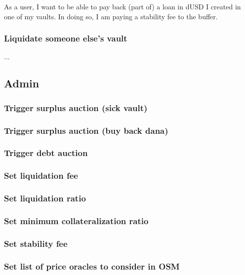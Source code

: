 \documentclass{article} %
\begin{document}
As a user, I want to be able to pay back (part of) a loan in dUSD I created in
one of my vaults. In doing so, I am paying a stability fee to the buffer.

\subsubsection{Liquidate someone else's vault}

...

\subsection{Admin}

\subsubsection{Trigger surplus auction (sick vault)}

\subsubsection{Trigger surplus auction (buy back dana)}

\subsubsection{Trigger debt auction}

\subsubsection{Set liquidation fee}

\subsubsection{Set liquidation ratio}

\subsubsection{Set minimum collateralization ratio}

\subsubsection{Set stability fee}

\subsubsection{Set list of price oracles to consider in OSM}
\end{document}
